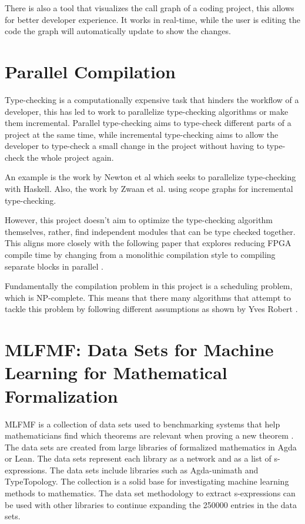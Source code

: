 There is also a tool \cite{call_graph_vis} that visualizes the call graph of a
coding project, this allows for better developer experience. It works in
real-time, while the user is editing the code the graph will automatically
update to show the changes.

\section{Parallel Compilation}

Type-checking is a computationally expensive task that hinders the workflow of
a developer, this has led to work to parallelize type-checking algorithms or
make them incremental. Parallel type-checking aims to type-check different
parts of a project at the same time, while incremental type-checking aims to
allow the developer to type-check a small change in the project without having
to type-check the whole project again.

An example is the work by Newton et al \cite{paralele_comp_haskell} which seeks to
parallelize type-checking with Haskell. Also, the work by Zwaan et al.
\cite{incremental_type_checking} using scope graphs for incremental
type-checking.

However, this project doesn't aim to optimize the type-checking algorithm
themselves, rather, find independent modules that can be type checked together.
This aligns more closely with the following paper that explores reducing FPGA
compile time by changing from a monolithic compilation style to compiling
separate blocks in parallel \cite{FPGA}.

Fundamentally the compilation problem in this project is a scheduling problem,
which is NP-complete\cite{scheduling}. This means that there many algorithms
that attempt to tackle this problem by following different assumptions as shown
by Yves Robert \cite{scheduling}.



\section{MLFMF: Data Sets for Machine Learning for Mathematical Formalization}

MLFMF is a collection of data sets used to benchmarking systems that help
mathematicians find which theorems are relevant when proving a new theorem \cite{bauer2023mlfmf}. The
data sets are created from large libraries of formalized mathematics in Agda or
Lean. The data sets represent each library as a network and as a list of
s-expressions. The data sets include libraries such as Agda-unimath and
TypeTopology. The collection is a solid base for investigating machine learning
methods to mathematics. The data set methodology to extract s-expressions can
be used with other libraries to continue expanding the 250000 entries in the
data sets.

